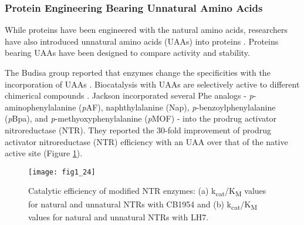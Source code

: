 \begin{refsection}
\subsubsection{Protein Engineering Bearing Unnatural Amino Acids}
\label{sec:uaa-intro}

While proteins have been engineered with the natural amino acids, researchers
have also introduced unnatural amino acids (UAAs) into proteins
\cite{Odar2015,Hassan2008,Kiick2000,Hammill2007,Meinnel1990,Johnson2010}.
Proteins bearing UAAs have been designed to compare activity and stability.  

The Budisa group reported that enzymes change the specificities with the
incorporation of UAAs \cite{Budisa2006}. Biocatalysis with UAAs
are selectively active to different chimerical compounds \cite{Jackson2006a}.
Jackson  incorporated several Phe analogs -
\emph{p}-aminophenylalanine (\emph{p}AF), naphthylalanine (Nap),
\emph{p}-benzoylphenylalanine (\emph{p}Bpa), and \emph{p}-methyoxyphenylalanine
(\emph{p}MOF) - into the prodrug activator nitroreductase (NTR). They reported
the 30-fold improvement of prodrug activator nitroreductase (NTR) efficiency
with an UAA over that of the native active site\cite{Jackson2006a} (Figure
\ref{fig:selectivity-example}).
\begin{figure}[p] \centering \texttt{[image: fig1\_24]}
    \caption[Catalytic efficiency of modified NTR enzymes: (a)
        k\textsubscript{cat}/K\textsubscript{M} values for natural and
        unnatural NTRs with CB1954 and (b)
        k\textsubscript{cat}/K\textsubscript{M} values for natural and
    unnatural NTRs with LH7.]{Catalytic efficiency of modified NTR enzymes: (a)
        k\textsubscript{cat}/K\textsubscript{M} values for natural and
        unnatural NTRs with CB1954 and (b)
        k\textsubscript{cat}/K\textsubscript{M} values for natural and
        unnatural NTRs with LH7\cite{Jackson2006a}.}
    \label{fig:selectivity-example} 
\end{figure}


\end{refsection}
